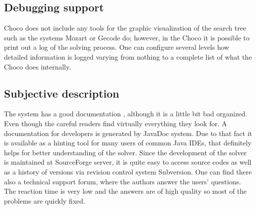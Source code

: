 \subsection{Debugging support}
Choco does not include any tools for the graphic visualization of the search tree such as the systems Mozart or Gecode do;
however, in the Choco it is possible to print out a log of the solving process.
One can configure several levels how detailed information is logged varying from
nothing to a complete list of what the Choco does internally.

\subsection{Subjective description}
The system has a good documentation \cite{choco:documentation}, although it is a little bit bad organized. Even though the careful readers
find virtually everything they look for. A documentation for developers is generated
by JavaDoc system. Due to that fact it is available as a hinting tool for many users of common Java IDEs, 
that definitely helps for better understanding of the solver. Since the development of the solver is
maintained at SourceForge server, it is quite easy to access source codes as well as a history of versions via
revision control system Subversion. One can find there also a technical support forum, where the authors
answer the users' questions. The reaction time is very low and the answers are of high
quality so most of the problems are quickly fixed.